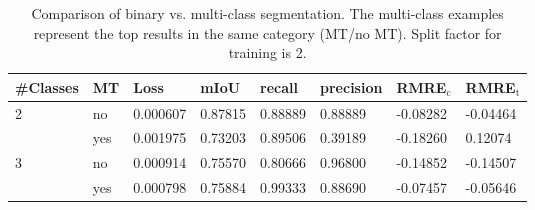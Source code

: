 \begin{table}[htbp]
    \centering
    \begin{tabular}{@{}llllllll@{}}
        \toprule
        \#Classes & MT  & Loss     & mIoU    & recall  & precision & RMRE$_\text{c}$ & RMRE$_\text{t}$ \\ \midrule
        2         & no  & 0.000607 & 0.87815 & 0.88889 & 0.88889   & -0.08282        & -0.04464        \\
                  & yes & 0.001975 & 0.73203 & 0.89506 & 0.39189   & -0.18260        & \phantom{-}0.12074         \\
        3         & no  & 0.000914 & 0.75570 & 0.80666 & 0.96800   & -0.14852        & -0.14507        \\
                  & yes & 0.000798 & 0.75884 & 0.99333 & 0.88690   & -0.07457        & -0.05646        \\ \bottomrule
        \end{tabular}
    \vspace{0.2cm}
    \caption{Comparison of binary vs. multi-class segmentation. The multi-class examples represent the top results in the same category (MT/no MT). Split factor for training is 2.}
    \label{tab:binary_labels}
\end{table}
